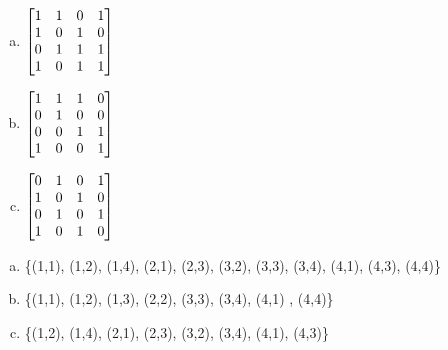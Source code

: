 \begin{itemize}
\begin{enumerate}[a.]
              \item
                    $
                        \begin{bmatrix}
                            1 & 1 & 0 & 1 \\
                            1 & 0 & 1 & 0 \\
                            0 & 1 & 1 & 1 \\
                            1 & 0 & 1 & 1
                        \end{bmatrix}
                        \vspace{2mm}
                    $
              \item
                    $
                        \begin{bmatrix}
                            1 & 1 & 1 & 0 \\
                            0 & 1 & 0 & 0 \\
                            0 & 0 & 1 & 1 \\
                            1 & 0 & 0 & 1
                        \end{bmatrix}
                        \vspace{2mm}
                    $
              \item
                    $
                        \begin{bmatrix}
                            0 & 1 & 0 & 1 \\
                            1 & 0 & 1 & 0 \\
                            0 & 1 & 0 & 1 \\
                            1 & 0 & 1 & 0
                        \end{bmatrix}
                        \vspace{2mm}
                    $
          \end{enumerate}
          \answer
          \begin{enumerate}[a.]
              \item \{(1,1), (1,2), (1,4), (2,1), (2,3), (3,2), (3,3), (3,4), (4,1), (4,3), (4,4)\}
              \item \{(1,1), (1,2), (1,3), (2,2), (3,3), (3,4), (4,1) , (4,4)\}
              \item \{(1,2), (1,4), (2,1), (2,3), (3,2), (3,4), (4,1), (4,3)\}
          \end{enumerate}


\end{itemize}
